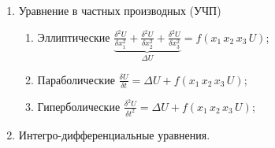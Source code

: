 \begin{enumerate}
	\item Уравнение в частных производных (УЧП)
	\begin{enumerate}
		\item Эллиптические $\underbrace{\frac{\delta^2 U}{\delta x_1^2} + \frac{\delta^2 U}{\delta x^2_2} + \frac{\delta^2 U}{\delta x^2_3}}_{\Delta U} = f(x_1\, x_2\, x_3\, U)$;
		\item Параболические $\displaystyle\frac{\delta U}{\delta t} = \Delta U + f(x_1\, x_2\, x_3\, U)$;
		\item Гиперболические $\displaystyle\frac{\delta^2 U}{\delta t^2} = \Delta U + f(x_1\, x_2\, x_3\, U)$;
	\end{enumerate}
	\item Интегро-дифференциальные уравнения.
\end{enumerate}

